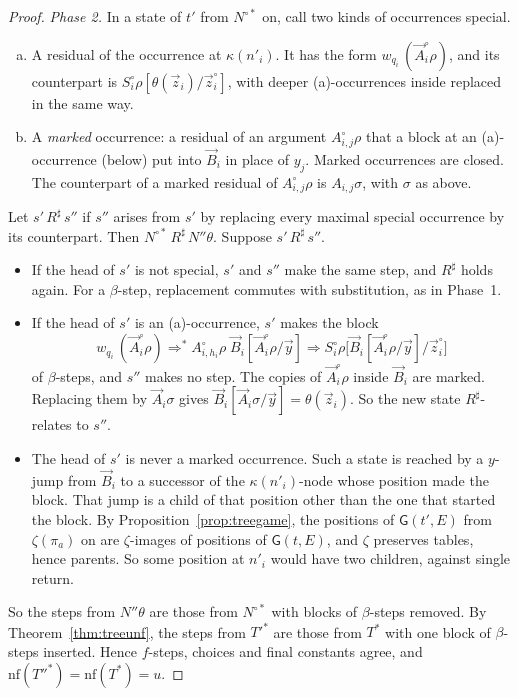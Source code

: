 \documentclass[11pt]{article}
\newcommand{\Gm}{\mathsf{G}}
\theoremstyle{plain}
\theoremstyle{definition}
\theoremstyle{remark}
\begin{document}
\begin{proof}
\emph{Phase 2.}  In a state of $t'$ from $N^{\circ*}$ on, call two kinds
of occurrences special.
\begin{enumerate}[(a)]
\item A residual of the occurrence at $\kappa(n'_i)$.  It has the form
  $w_{q_i}\,(\vec A^\circ_i\rho)$, and its counterpart is
  $S^\circ_i\rho[\theta(\vec z_i)/\vec z^\circ_i]$, with deeper (a)-occurrences
  inside replaced in the same way.
\item A \emph{marked} occurrence: a residual of an argument
  $A^\circ_{i,j}\rho$ that a block at an (a)-occurrence (below) put into
  $\vec B_i$ in place of $y_j$.  Marked occurrences are closed.  The
  counterpart of a marked residual of $A^\circ_{i,j}\rho$ is
  $A_{i,j}\sigma$, with $\sigma$ as above.
\end{enumerate}
Let $s'\,R^\sharp\,s''$ if $s''$ arises from $s'$ by replacing every
maximal special occurrence by its counterpart.  Then
$N^{\circ*}\,R^\sharp\,N''\theta$.  Suppose $s'\,R^\sharp\,s''$.
\begin{itemize}
\item If the head of $s'$ is not special, $s'$ and $s''$ make the same
  step, and $R^\sharp$ holds again.  For a $\beta$-step, replacement
  commutes with substitution, as in Phase~1.
\item If the head of $s'$ is an (a)-occurrence, $s'$ makes the block
  \[
  w_{q_i}\,(\vec A^\circ_i\rho)\Rightarrow^*
  A^\circ_{i,h_i}\rho\;\vec B_i[\vec A^\circ_i\rho/\vec y]
  \Rightarrow
  S^\circ_i\rho\bigl[\vec B_i[\vec A^\circ_i\rho/\vec y]/\vec z^\circ_i\bigr]
  \]
  of $\beta$-steps, and $s''$ makes no step.  The copies of
  $\vec A^\circ_i\rho$ inside $\vec B_i$ are marked.  Replacing them by
  $\vec A_i\sigma$ gives $\vec B_i[\vec A_i\sigma/\vec y]=\theta(\vec
  z_i)$.  So the new state $R^\sharp$-relates to $s''$.
\item The head of $s'$ is never a marked occurrence.  Such a state is
  reached by a $y$-jump from $\vec B_i$ to a successor of the
  $\kappa(n'_i)$-node whose position made the block.  That jump is a
  child of that position other than the one that started the block.  By
  Proposition~\ref{prop:treegame}, the positions of $\Gm(t',E)$ from
  $\zeta(\pi_a)$ on are $\zeta$-images of positions of $\Gm(t,E)$, and
  $\zeta$ preserves tables, hence parents.  So some position at $n'_i$
  would have two children, against single return.
\end{itemize}
So the steps from $N''\theta$ are those from $N^{\circ*}$ with blocks of
$\beta$-steps removed.  By Theorem~\ref{thm:treeunf}, the steps from
$T'^*$ are those from $T^*$ with one block of $\beta$-steps inserted.
Hence $f$-steps, choices and final constants agree, and
$\mathrm{nf}(T''^*)=\mathrm{nf}(T^*)=u$.
\end{proof}
\end{document}
